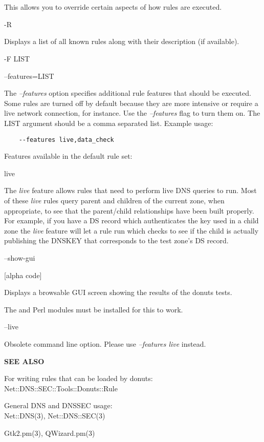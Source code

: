 \begin{description}
This allows you to override certain aspects of how rules are executed.

\item -R\verb" "

Displays a list of all known rules along with their description (if
available).

\item -F LIST\verb" "

\item --features=LIST\verb" "

The {\it --features} option specifies additional rule features that should
be executed.  Some rules are turned off by default because they are
more intensive or require a live network connection, for instance.
Use the {\it --features} flag to turn them on.  The LIST argument should be
a comma separated list.  Example usage:

\begin{verbatim}
    --features live,data_check
\end{verbatim}

Features available in the default rule set:

\begin{description}

\item live\verb" "

The {\it live} feature allows rules that need to perform live DNS queries
to run.  Most of these {\it live} rules query parent and children of the
current zone, when appropriate, to see that the parent/child
relationships have been built properly.  For example, if you have a
DS record which authenticates the key used in a child zone the {\it live}
feature will let a rule run which checks to see if the child is
actually publishing the DNSKEY that corresponds to the test zone's DS
record.

\end{description}

\item --show-gui\verb" "

[alpha code]

Displays a browsable GUI screen showing the results of the donuts tests.

The  and  Perl modules must be installed for
this to work.

\item --live\verb" "

Obsolete command line option.  Please use {\it --features live} instead.

\end{description}

{\bf SEE ALSO}

For writing rules that can be loaded by donuts:\\
Net::DNS::SEC::Tools::Donuts::Rule

General DNS and DNSSEC usage:\\
Net::DNS(3), Net::DNS::SEC(3)

Gtk2.pm(3),
QWizard.pm(3)

